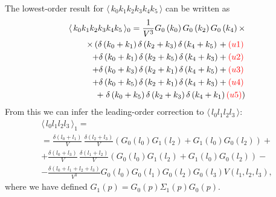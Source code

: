 \documentclass[12pt]{article}
\newcommand{\lr}[1]{ \left( #1 \right) }
\newcommand{\vev}[1]{ \langle \, #1 \, \rangle }
\newcommand{\red}[1]{ \textcolor{red}{#1} }
\begin{document}
 The lowest-order result for $\vev{k_0 k_1 k_2 k_3 k_4 k_5}$ can be written as
\begin{eqnarray}
\label{G6_0}
 \vev{k_0 k_1 k_2 k_3 k_4 k_5}_0
 =
 \frac{1}{V^3} G_0\lr{k_0} G_0\lr{k_2} G_0\lr{k_4}
 \times \nonumber \\ \times
 \left(
 \delta\lr{k_0 + k_1} \delta\lr{k_2 + k_3} \delta\lr{k_4 + k_5}
 \right. + \red{(u1)} \, \nonumber\\ +
 \delta\lr{k_0 + k_1} \delta\lr{k_2 + k_5} \delta\lr{k_4 + k_3}
         + \red{(u2)} \, \nonumber\\ +
 \delta\lr{k_0 + k_3} \delta\lr{k_2 + k_1} \delta\lr{k_4 + k_5}
         + \red{(u3)} \, \nonumber\\ +
 \delta\lr{k_0 + k_5} \delta\lr{k_2 + k_1} \delta\lr{k_4 + k_3}
         + \red{(u4)} \, \nonumber\\ + \left.
 \delta\lr{k_0 + k_5} \delta\lr{k_2 + k_3} \delta\lr{k_4 + k_1}
           \red{(u5)}
 \right)
\end{eqnarray}
From this we can infer the leading-order correction to $\vev{l_0 l_1 l_2 l_3}$:
\begin{eqnarray}
\label{G4_1}
 \vev{l_0 l_1 l_2 l_3}_1
 = \nonumber \\ =
  \frac{\delta\lr{l_0 + l_1}}{V} \, \frac{\delta\lr{l_2 + l_3}}{V} \lr{ G_0\lr{l_0} G_1\lr{l_2} + G_1\lr{l_0} G_0\lr{l_2} }
  + \nonumber \\ +
  \frac{\delta\lr{l_0 + l_3}}{V} \, \frac{\delta\lr{l_1 + l_2}}{V} \lr{ G_0\lr{l_0} G_1\lr{l_2} + G_1\lr{l_0} G_0\lr{l_2} }
 - \nonumber \\ -
 \frac{\delta\lr{l_0 + l_1 + l_2 + l_3}}{V^3}
 G_0\lr{l_0} G_0\lr{l_1} G_0\lr{l_2} G_0\lr{l_3}
 V\lr{l_1, l_2, l_3} ,
\end{eqnarray}
where we have defined $G_1\lr{p} = G_0\lr{p} \Sigma_1\lr{p} G_0\lr{p}$.
\end{document}
